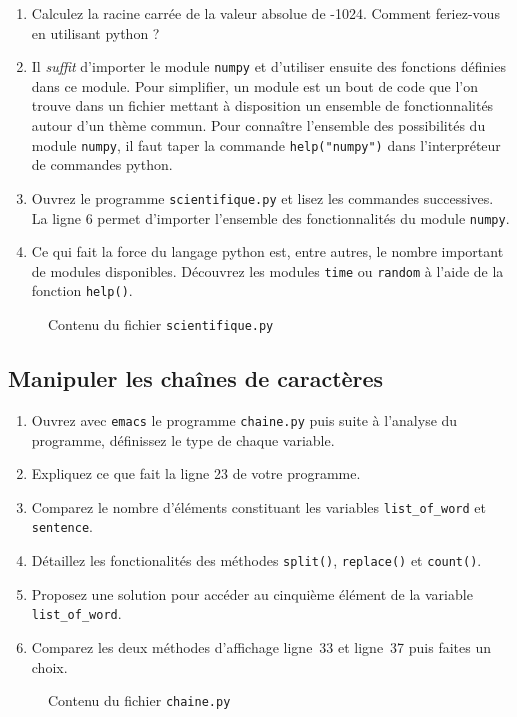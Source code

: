 \begin{enumerate}
\item Calculez la racine carrée de la valeur absolue de -1024.
  Comment feriez-vous en utilisant python ?


\item Il \textit{suffit} d'importer le module \texttt{numpy} et d'utiliser ensuite
  des fonctions définies dans ce module.
  Pour simplifier, un module est un bout de code que l'on trouve dans un fichier
  mettant à disposition un ensemble de fonctionnalités autour d'un thème commun.
  Pour connaître l'ensemble des possibilités du module \texttt{numpy}, il faut taper la commande
  \texttt{help("numpy")} dans l'interpréteur de commandes python.


\item Ouvrez le programme \texttt{scientifique.py} et lisez les commandes successives.
  La ligne 6 permet d'importer l'ensemble des fonctionnalités du module \texttt{numpy}.


\item Ce qui fait la force du langage python est, entre autres, le nombre important de modules disponibles.
  Découvrez les modules \texttt{time} ou \texttt{random} à l'aide de la fonction \texttt{help()}.



\end{enumerate}


\begin{figure}  
  
  \caption{Contenu du fichier \texttt{scientifique.py}}
  \label{polynome_scientifique}
\end{figure}


\subsection{Manipuler les chaînes de caractères}


\begin{enumerate}

\item Ouvrez avec  \texttt{emacs} le  programme \texttt{chaine.py} puis
  suite à l'analyse du programme, définissez le type de chaque variable.

\item Expliquez ce que fait la ligne 23 de votre programme.

\item Comparez le nombre d'éléments constituant les variables \texttt{list\_of\_word} et  \texttt{sentence}.

\item Détaillez les fonctionalités des méthodes \texttt{split()}, \texttt{replace()} et \texttt{count()}.

\item Proposez une solution pour accéder au cinquième élément de la variable \texttt{list\_of\_word}.

\item Comparez les deux méthodes d'affichage ligne~33 et ligne~37 puis faites un choix.


\end{enumerate}


\begin{figure}  
  
  \caption{Contenu du fichier \texttt{chaine.py}}
  \label{polynome_chaine}
\end{figure}